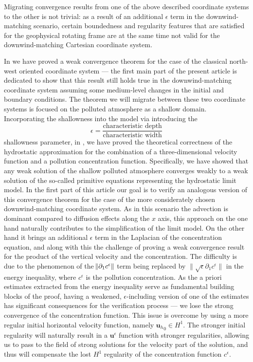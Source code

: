 \documentclass[11pt, a4paper]{article}
\begin{document}
Migrating convergence results from one of the above described coordinate systems to the other is not trivial: as a result of an additional $\epsilon$ term in the downwind-matching scenario, certain boundedness and regularity features that are satisfied for the geophysical rotating frame are at the same time not valid for the downwind-matching Cartesian coordinate system.

In \cite{pollatmws2019} we have proved a weak convergence theorem for the case of the classical north-west oriented coordinate system --- the first main part of the present article is dedicated to show that this result still holds true in the downwind-matching coordinate system assuming some medium-level changes in the initial and boundary conditions. The theorem we will migrate between these two coordinate systems is focused on the polluted atmosphere as a shallow domain. Incorporating the shallowness into the model via introducing the 
$$\epsilon = \frac{\text{characteristic depth}}{\text{characteristic width}}$$ 
shallowness parameter, in \cite{pollatmws2019}, we have proved the theoretical correctness of the hydrostatic approximation for the combination of a three-dimensional velocity function and a pollution concentration function. Specifically, we have showed that any weak solution of the shallow polluted atmosphere converges weakly to a weak solution of the so-called primitive equations representing the hydrostatic limit model. In the first part of this article our goal is to verify an analogous version of this convergence theorem for the case of the more considerately chosen downwind-matching coordinate system. As in this scenario the advection is dominant compared to diffusion effects along the $x$ axis, this approach on the one hand naturally contributes to the simplification of the limit model. On the other hand it brings an additional $\epsilon$ term in the Laplacian of the concentration equation, and along with this the challenge of proving a weak convergence result for the product of the vertical velocity and the concentration. The difficulty is due to the phenomenon of the $\norm{\partial_1 c^\epsilon}$ term being replaced by $\| \sqrt{\epsilon} \partial_1 c^\epsilon \|$ in the energy inequality, where $c^\epsilon$ is the pollution concentration. As the a priori estimates extracted from the energy inequality serve as fundamental building blocks of the proof, having a weakened, $\epsilon$-including version of one of the estimates has significant consequences for the verification process --- we lose the strong convergence of the concentration function. This issue is overcome by using a more regular initial horizontal velocity function, namely ${\mathbf{u}_h}_0 \in H^1.$ The stronger initial regularity will naturally result in a $\mathbf{u}^\epsilon$ function with stronger regularities, allowing us to pass to the field of strong solutions for the velocity part of the solution, and thus will compensate the lost $H^1$ regularity of the concentration function $c^\epsilon.$ 
\end{document}
